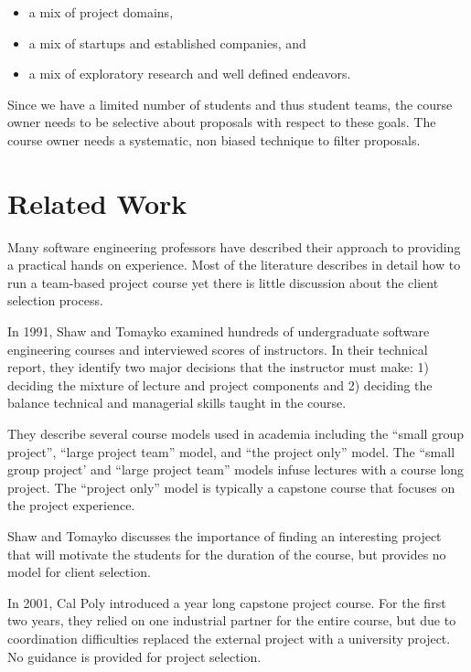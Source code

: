 \documentclass[conference]{IEEEtran}
\begin{document}
\begin{itemize}
\itemsep1pt\parskip0pt
\item
  a mix of project domains,
\item
  a mix of startups and established companies, and 
\item
  a mix of exploratory research and well defined
  endeavors.
\end{itemize}

Since we have a limited number of students and thus student teams, the
course owner needs to be selective about proposals with respect to these
goals. The course owner needs a systematic, non biased technique to
filter proposals.

\section{Related Work}
\label{Related Work}
Many software engineering professors have described their approach to providing a practical hands on experience. Most of the literature describes in detail how to run a team-based project course yet there is little discussion about the client selection process. 

In 1991, Shaw and Tomayko \cite{shaw1991models} examined hundreds of undergraduate software engineering courses and interviewed scores of instructors. In their technical report, they identify two major decisions that the instructor must make: 1) deciding the mixture of lecture and project components and 2) deciding the balance technical and managerial skills taught in the course. 

They describe several course models used in academia including the ``small group project'', ``large project team'' model, and  ``the project only'' model. The ``small group project' and  ``large project team'' models infuse lectures with a course long project. The ``project only'' model is typically a capstone course that focuses on the project experience.

Shaw and Tomayko discusses the importance of finding an interesting project that will motivate the students for the duration of the course, but provides no model for client selection.

In 2001, Cal Poly \cite {Turner2001} introduced a year long capstone project course. For the first two years, they relied on one industrial partner for the entire course, but due to coordination difficulties replaced the external project with a university project. No guidance is provided for project selection.
\end{document}
